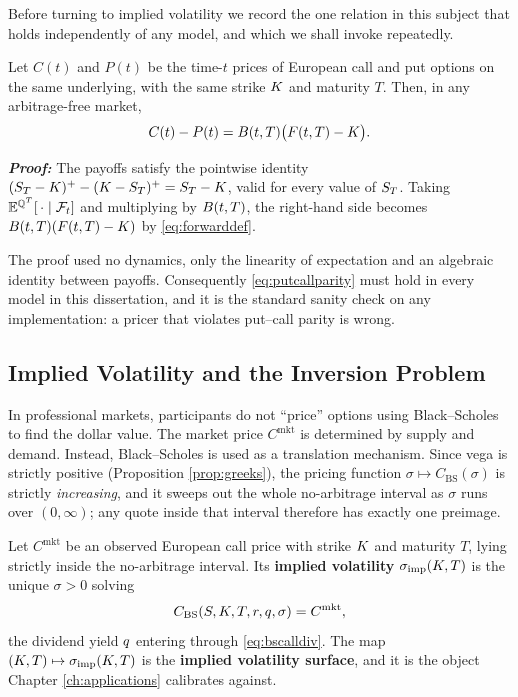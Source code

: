 Before turning to implied volatility we record the one relation in this subject that holds 
independently of any model, and which we shall invoke repeatedly.

\begin{proposition}\label{prop:putcallparity}
Let $C(t)$ and $P(t)$ be the time-$t$ prices of European call and put options on the same underlying, 
with the same strike $K$ and maturity $T$. Then, in any arbitrage-free market,
\begin{equation}\label{eq:putcallparity}
C(t) - P(t) = B(t,T)\bigl(F(t,T) - K\bigr).
\end{equation}
\end{proposition}

\textbf{\textit{Proof:}} The payoffs satisfy the pointwise identity 
$(S_T-K)^+ - (K-S_T)^+ = S_T - K$, valid for every value of $S_T$. 
Taking $\mathbb{E}^{\mathbb{Q}^{T}}[\,\cdot\mid\mathcal{F}_t]$ and multiplying by $B(t,T)$, the right-hand side becomes 
$B(t,T)(F(t,T)-K)$ by \eqref{eq:forwarddef}. \qedfilledtext

The proof used no dynamics, only 
the linearity of expectation and an algebraic identity between payoffs. Consequently 
\eqref{eq:putcallparity} must hold in every model in this dissertation, and it is the standard 
sanity check on any implementation: a pricer that violates put--call parity is wrong.

\subsection{Implied Volatility and the Inversion Problem}\label{subsec:impliedvol}
In professional markets, participants do not ``price'' options using Black--Scholes to find the dollar value. The market price $C^{\mathrm{mkt}}$ is determined by supply and demand. Instead, Black--Scholes is used as a translation mechanism. Since vega is strictly positive (Proposition \ref{prop:greeks}), the pricing function $\sigma \mapsto C_{\mathrm{BS}}(\sigma)$ is strictly \emph{increasing}, and it sweeps out the whole no-arbitrage interval as $\sigma$ runs over $(0,\infty)$; any quote inside that interval therefore has exactly one preimage.

\begin{definition}\label{def:impliedvol}
Let $C^{\mathrm{mkt}}$ be an observed European call price with strike $K$ and maturity $T$,
lying strictly inside the no-arbitrage interval. Its \textbf{implied volatility}
$\sigma_{\mathrm{imp}}(K,T)$ is the unique $\sigma > 0$ solving
\begin{equation}\label{eq:impliedvoldef}
    C_{\mathrm{BS}}(S, K, T, r, q, \sigma) = C^{\mathrm{mkt}},
\end{equation}
the dividend yield $q$ entering through \eqref{eq:bscalldiv}. The map
$(K,T)\mapsto\sigma_{\mathrm{imp}}(K,T)$ is the \textbf{implied volatility surface}, and it is the object
Chapter \ref{ch:applications} calibrates against.
\end{definition}

